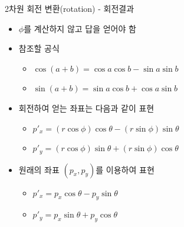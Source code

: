 \documentclass{beamer}
\begin{document}
\begin{frame}{2차원 회전 변환(rotation) - 회전결과}

\begin{itemize}
\item $\phi$를 계산하지 않고 답을 얻어야 함
\item 참조할 공식
	\begin{itemize}
	\item $\cos (a+b) = \cos a \cos b - \sin a \sin b$
	\item $\sin (a+b) = \sin a \cos b + \cos a \sin b$
	\end{itemize}
\item 회전하여 얻는 좌표는 다음과 같이 표현
	\begin{itemize}
	\item $p'_x = (r \cos \phi) \cos \theta - (r \sin \phi )\sin \theta$
	\item $p'_y = (r \cos \phi) \sin \theta + (r \sin \phi )\cos \theta$
	\end{itemize}
\item 원래의 좌표 $(p_x , p_y )$를 이용하여 표현
	\begin{itemize}
	\item $p'_x = p_x \cos \theta - p_y \sin \theta$
	\item $p'_y = p_x \sin \theta + p_y \cos \theta$
	\end{itemize} 
\end{itemize}



\end{frame}
\end{document}
